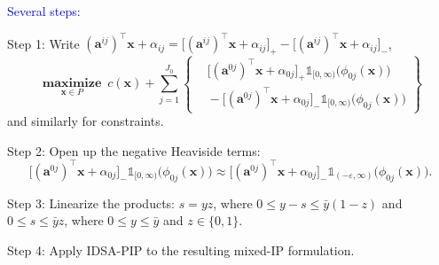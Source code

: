 \documentclass[aspectratio=169,xcolor=dvipsnames]{beamer}
\begin{document}
\begin{frame}
  \footnotesize
  \setlength{\abovedisplayskip}{4pt}
  \setlength{\belowdisplayskip}{4pt}
  \setlength{\parskip}{0.10cm}

  \textcolor{MediumBlue}{Several steps:}

  \textcolor{MediumRed}{Step 1:} Write
  $(\mathbf{a}^{ij})^\top\mathbf{x}+\alpha_{ij}
    =\bigl[(\mathbf{a}^{ij})^\top\mathbf{x}+\alpha_{ij}\bigr]_+
    -\bigl[(\mathbf{a}^{ij})^\top\mathbf{x}+\alpha_{ij}\bigr]_-$,
  \[
    \operatorname*{\textbf{maximize}}_{\mathbf{x}\in P}\ c(\mathbf{x})
    +\sum_{j=1}^{J_0}\left\{
      \begin{aligned}
        &\bigl[(\mathbf{a}^{0j})^\top\mathbf{x}+\alpha_{0j}\bigr]_+
          \mathds{1}_{[0,\infty)}\bigl(\phi_{0j}(\mathbf{x})\bigr)\\
        &{}-\bigl[(\mathbf{a}^{0j})^\top\mathbf{x}+\alpha_{0j}\bigr]_-
          \mathds{1}_{[0,\infty)}\bigl(\phi_{0j}(\mathbf{x})\bigr)
      \end{aligned}\right\}
  \]
  and similarly for constraints.

  \textcolor{MediumRed}{Step 2:} Open up the negative Heaviside terms:
  \[
    \bigl[(\mathbf{a}^{0j})^\top\mathbf{x}+\alpha_{0j}\bigr]_-
      \mathds{1}_{[0,\infty)}\bigl(\phi_{0j}(\mathbf{x})\bigr)
    \approx
    \bigl[(\mathbf{a}^{0j})^\top\mathbf{x}+\alpha_{0j}\bigr]_-
      \mathds{1}_{(-\varepsilon,\infty)}\bigl(\phi_{0j}(\mathbf{x})\bigr).
  \]

  \textcolor{MediumRed}{Step 3:} Linearize the products: $s=yz$, where
  $0\leq y-s\leq\bar{y}(1-z)$ and $0\leq s\leq\bar{y}z$, where
  $0\leq y\leq\bar{y}$ and $z\in\{0,1\}$.

  \textcolor{MediumRed}{Step 4:} Apply IDSA-PIP to the resulting mixed-IP
  formulation.
\end{frame}

\end{document}
